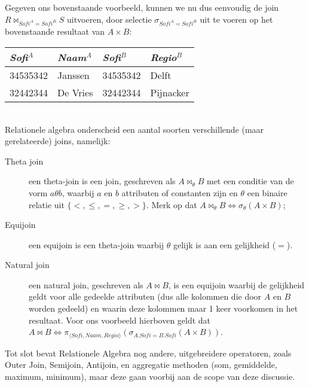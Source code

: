 Gegeven ons bovenstaande voorbeeld, kunnen we nu dus eenvoudig de join $R\Join_{Sofi^A=Sofi^B}S$ uitvoeren, door selectie $\sigma_{Sofi^A=Sofi^B}$ uit te voeren op het bovenstaande resultaat van $A\times B$:\\[2.5pt]
\begin{tabular}{|l|l|l|l|}
\hline
\textit{Sofi}$^A$ & \textit{Naam}$^A$ & \textit{Sofi}$^B$ & \textit{Regio}$^B$\\
\hline
34535342 & Janssen & 34535342 & Delft\\
32442344 & De Vries & 32442344 & Pijnacker\\
\hline
\end{tabular}\\[2.5pt]
Relationele algebra onderscheid een aantal soorten verschillende (maar gerelateerde) joins, namelijk:
\begin{description}
\item[Theta join] een theta-join is een join, geschreven als $A\Join_\theta B$ met een conditie van de vorm $a \theta b$, waarbij $a$ en $b$ attributen of constanten zijn en $\theta$ een binaire relatie uit $\{ <, \leq, =, \geq, > \}$. Merk op dat $A\Join_\theta B \Leftrightarrow \sigma_\theta(A\times B)$;
\item[Equijoin] een equijoin is een theta-join waarbij $\theta$ gelijk is aan een gelijkheid ($=$).
\item[Natural join] een natural join, geschreven als $A\Join B$, is een equijoin waarbij de gelijkheid geldt voor alle gedeelde attributen (dus alle kolommen die door $A$ en $B$ worden gedeeld) en waarin deze kolommen maar 1 keer voorkomen in het resultaat. Voor ons voorbeeld hierboven geldt dat $A\Join B\Leftrightarrow \pi_{\langle Sofi,Naam,Regio\rangle}(\sigma_{A.Sofi=B.Sofi}(A\times B))$.
\end{description}

Tot slot bevat Relationele Algebra nog andere, uitgebreidere operatoren, zoals Outer Join, Semijoin, Antijoin, en aggregatie methoden (som, gemiddelde, maximum, minimum), maar deze gaan voorbij aan de scope van deze discussie.

